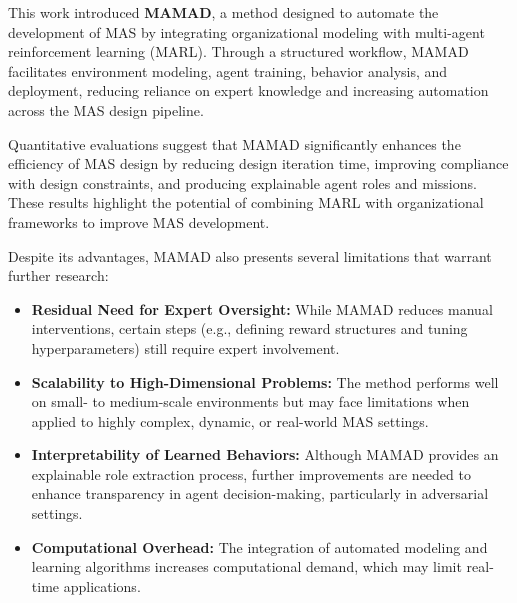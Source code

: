 \documentclass[pdflatex,sn-mathphys-num]{sn-jnl}%
\theoremstyle{thmstyleone}%
\theoremstyle{thmstyletwo}%
\theoremstyle{thmstylethree}%
\begin{document}
This work introduced \textbf{MAMAD}, a method designed to automate the development of MAS by integrating organizational modeling with multi-agent reinforcement learning (MARL). Through a structured workflow, MAMAD facilitates environment modeling, agent training, behavior analysis, and deployment, reducing reliance on expert knowledge and increasing automation across the MAS design pipeline. 

Quantitative evaluations suggest that MAMAD significantly enhances the efficiency of MAS design by reducing design iteration time, improving compliance with design constraints, and producing explainable agent roles and missions. These results highlight the potential of combining MARL with organizational frameworks to improve MAS development.


Despite its advantages, MAMAD also presents several limitations that warrant further research:
%
\begin{itemize}
    \item \textbf{Residual Need for Expert Oversight:} While MAMAD reduces manual interventions, certain steps (e.g., defining reward structures and tuning hyperparameters) still require expert involvement.
    \item \textbf{Scalability to High-Dimensional Problems:} The method performs well on small- to medium-scale environments but may face limitations when applied to highly complex, dynamic, or real-world MAS settings.
    \item \textbf{Interpretability of Learned Behaviors:} Although MAMAD provides an explainable role extraction process, further improvements are needed to enhance transparency in agent decision-making, particularly in adversarial settings.
    \item \textbf{Computational Overhead:} The integration of automated modeling and learning algorithms increases computational demand, which may limit real-time applications.
\end{itemize}
\end{document}
